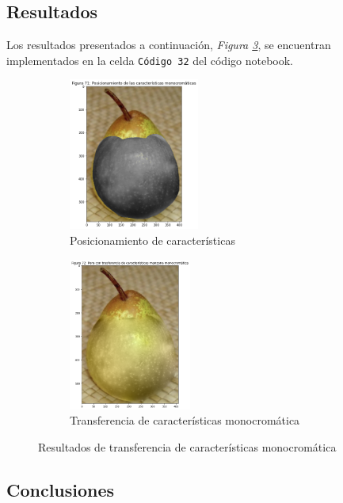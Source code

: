 \documentclass[11pt,twoside,titlepage,a4paper]{article}
\numberwithin{equation}{section} %
\theoremstyle{usual}
\begin{document}
\subsection{Resultados}

Los resultados presentados a continuación, \textit{Figura \ref{fig:manzanaPeraIntercambioMono}}, se encuentran implementados en la celda \texttt{Código 32} del código notebook.

\begin{figure}[h]
    \centering
    \begin{subfigure}[t]{.45\textwidth}
        \centering
        \includegraphics[height=5cm]{imagenes/PoissonImageEditing_cell_80_output_0.png}
        \caption{Posicionamiento de características}
        \label{fig:posCaracteristicasMono}
    \end{subfigure}
    \centering
    \begin{subfigure}[t]{.45\textwidth}
        \centering
        \includegraphics[height=5cm]{imagenes/PoissonImageEditing_cell_80_output_1.png}
        \caption{Transferencia de características monocromática}
        \label{fig:intercambioMonoPeraManzana}
    \end{subfigure}%
    \caption{Resultados de transferencia de características monocromática}
    \label{fig:manzanaPeraIntercambioMono}
\end{figure}

\subsection{Conclusiones}
\end{document}
